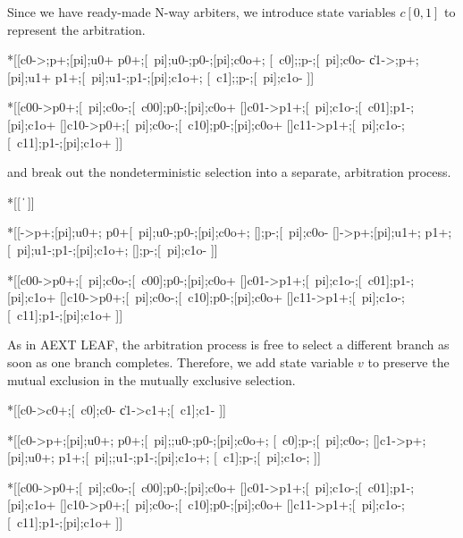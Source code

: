 \documentclass{article}
\begin{document}
\noindent
Since we have ready-made N-way arbiters, we introduce state variables $c[0,1]$ 
to represent the arbitration.

\begin{hse}
*[[c0\phi->;p\phi+;[pi];u0+
    p0+;[~pi];u0-;p0-;[pi];c0o+;
    [~c0\phi];;p\phi-;[~pi];c0o-
  \|c1\phi->;p\phi+;[pi];u1+
    p1+;[~pi];u1-;p1-;[pi];c1o+;
    [~c1\phi];;p\phi-;[~pi];c1o-
 ]]
\end{hse}

\begin{hse}
*[[c00->p0+;[~pi];c0o-;[~c00];p0-;[pi];c0o+
  []c01->p1+;[~pi];c1o-;[~c01];p1-;[pi];c1o+
  []c10->p0+;[~pi];c0o-;[~c10];p0-;[pi];c0o+
  []c11->p1+;[~pi];c1o-;[~c11];p1-;[pi];c1o+
 ]]
\end{hse}

\noindent
and break out the nondeterministic selection into a separate, arbitration process.

\begin{hse}
*[[
  \|
 ]]

*[[->p\phi+;[pi];u0+;
    p0+[~pi];u0-;p0-;[pi];c0o+;
    [];p\phi-;[~pi];c0o-
  []->p\phi+;[pi];u1+;
    p1+;[~pi];u1-;p1-;[pi];c1o+;
    [];p\phi-;[~pi];c1o-
 ]]
\end{hse}

\begin{hse}
*[[c00->p0+;[~pi];c0o-;[~c00];p0-;[pi];c0o+
  []c01->p1+;[~pi];c1o-;[~c01];p1-;[pi];c1o+
  []c10->p0+;[~pi];c0o-;[~c10];p0-;[pi];c0o+
  []c11->p1+;[~pi];c1o-;[~c11];p1-;[pi];c1o+
 ]]
\end{hse}

\noindent
As in AEXT LEAF, the arbitration process is free to select a different branch
as soon as one branch completes. Therefore, we add state variable $v$ to preserve the mutual exclusion in the mutually exclusive selection.

\begin{hse}
*[[c0\phi->c0+;[~c0\phi];c0-
  \|c1\phi->c1+;[~c1\phi];c1-
 ]]

*[[c0->p\phi+;[pi];u0+;
    p0+;[~pi];;u0-;p0-;[pi];c0o+;
    [~c0];p\phi-;[~pi];c0o-;
  []c1->p\phi+;[pi];u0+;
    p1+;[~pi];;u1-;p1-;[pi];c1o+;
    [~c1];p\phi-;[~pi];c1o-;
 ]]
\end{hse}

\begin{hse}
*[[c00->p0+;[~pi];c0o-;[~c00];p0-;[pi];c0o+
  []c01->p1+;[~pi];c1o-;[~c01];p1-;[pi];c1o+
  []c10->p0+;[~pi];c0o-;[~c10];p0-;[pi];c0o+
  []c11->p1+;[~pi];c1o-;[~c11];p1-;[pi];c1o+
 ]]
\end{hse}
\end{document}
